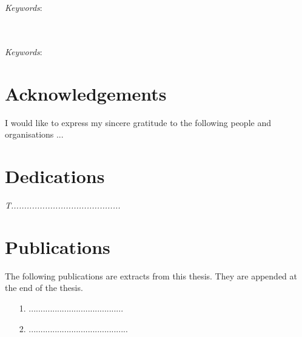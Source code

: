 \begin{abstract}[english]%
ddddddddddddddddddddddddddddddddddddd. 
\end{abstract}
\\\\
\textit{Keywords}: 



\begin{abstract}[afrikaans]%
.........................................................................
\end{abstract}
\\\\
\textit{Keywords}: 



\chapter*{Acknowledgements}%


I would like to express my sincere gratitude to the following people
and organisations ...


\chapter*{Dedications}%
 \vspace{6cm}
 \begin{center}\itshape
T..........................................
 \end{center}
\vfill
 \clearpage
\chapter{Publications}%

The following publications are extracts from this thesis. They are appended at the
end of the thesis.
\begin{itemize}
\item[1.] ........................................
\item[2.] ..........................................
\end{itemize}


\endinput
